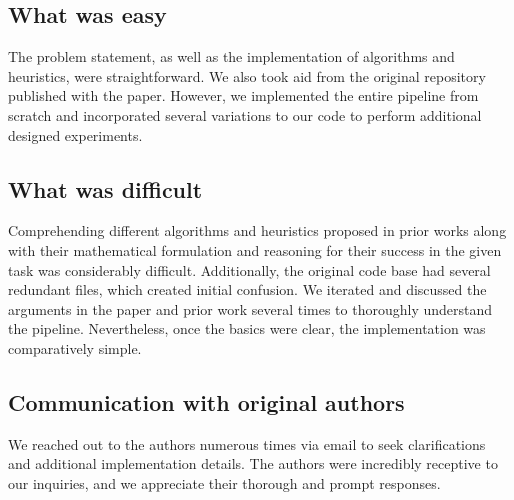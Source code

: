 \subsection*{What was easy}
The problem statement, as well as the implementation of algorithms and heuristics, were straightforward. We also took aid from the original repository published with the paper. However, we implemented the entire pipeline from scratch and incorporated several variations to our code to perform additional designed experiments.

\subsection*{What was difficult}
Comprehending different algorithms and heuristics proposed in prior works along with their mathematical formulation and reasoning for their success in the given task was considerably difficult. Additionally, the original code base had several redundant files, which created initial confusion. We iterated and discussed the arguments in the paper and prior work several times to thoroughly understand the pipeline. Nevertheless, once the basics were clear, the implementation was comparatively simple.


\subsection*{Communication with original authors}
We reached out to the authors numerous times via email to seek clarifications and additional implementation details. The authors were incredibly receptive to our inquiries, and we appreciate their thorough and prompt responses.

\newpage
